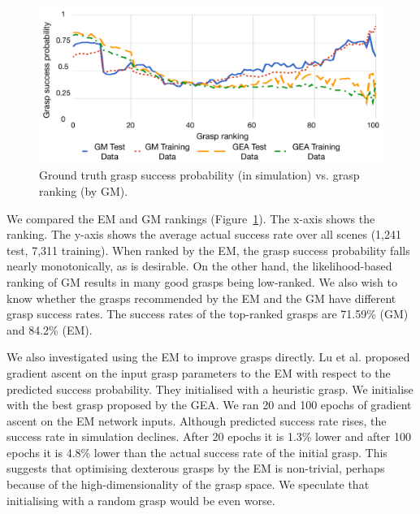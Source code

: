 \begin{figure}[t]
  \includegraphics[width=\linewidth]{images/successvsranking.pdf}
  \caption{Ground truth grasp success probability (in simulation) vs. grasp ranking (by GM).}
  \label{fig:successvsranking}
\end{figure}

We compared the EM and GM rankings (Figure~\ref{fig:successvsranking}). The x-axis shows the ranking. The y-axis shows the average actual success rate over all scenes (1,241 test, 7,311 training). When ranked by the EM, the grasp success probability falls nearly monotonically, as is desirable. On the other hand, the likelihood-based ranking of GM results in many good grasps being low-ranked. We also wish to know whether the grasps recommended by the EM and the GM have different grasp success rates. The success rates of the top-ranked grasps are 71.59\% (GM) and  84.2\% (EM).

We also investigated using the EM to improve grasps directly. Lu et al. \cite{lu2017planning} proposed gradient ascent on the input grasp parameters to the EM with respect to the predicted success probability. They initialised with a heuristic grasp. We initialise with the best grasp proposed by the GEA. We ran 20 and 100 epochs of gradient ascent on the EM network inputs. Although predicted success rate rises, the success rate in simulation declines. After 20 epochs it is 1.3\% lower and after 100 epochs it is 4.8\% lower than the actual success rate of the initial grasp. This suggests that optimising dexterous grasps by the EM is non-trivial, perhaps because of the high-dimensionality of the grasp space. We speculate that initialising with a random grasp would be even worse.

